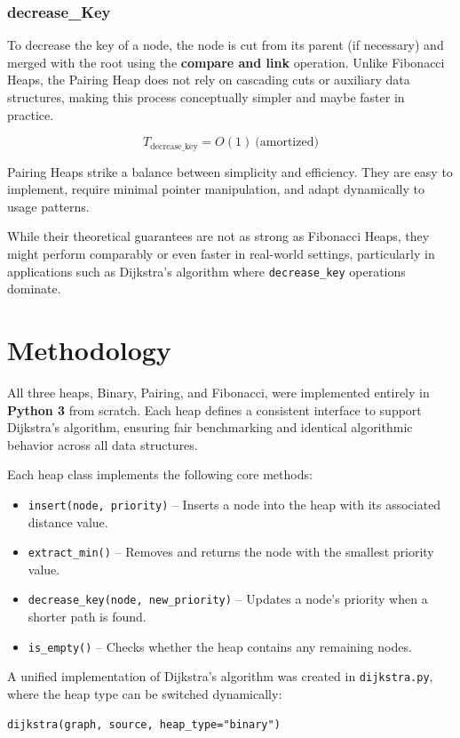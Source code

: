 \documentclass[acmsmall]{acmart}
\begin{document}
\subsubsection*{decrease\_Key}
To decrease the key of a node, the node is cut from its parent (if necessary) and merged with the root using the \textbf{compare and link} operation. Unlike Fibonacci Heaps, the Pairing Heap does not rely on cascading cuts or auxiliary data structures, making this process conceptually simpler and maybe faster in practice.

\[
T_{\text{decrease\_key}} = O(1)\ \text{(amortized)}
\]

Pairing Heaps strike a balance between simplicity and efficiency. They are easy to implement, require minimal pointer manipulation, and adapt dynamically to usage patterns.

\vspace{1em}
While their theoretical guarantees are not as strong as Fibonacci Heaps, they might perform comparably or even faster in real-world settings, particularly in applications such as Dijkstra’s algorithm where \texttt{decrease\_key} operations dominate.

\section{Methodology}
All three heaps, Binary, Pairing, and Fibonacci, were implemented entirely in \textbf{Python 3} from scratch.  
Each heap defines a consistent interface to support Dijkstra’s algorithm, ensuring fair benchmarking and identical algorithmic behavior across all data structures.

Each heap class implements the following core methods:
\begin{itemize}
  \item \texttt{insert(node, priority)} – Inserts a node into the heap with its associated distance value.
  \item \texttt{extract\_min()} – Removes and returns the node with the smallest priority value.
  \item \texttt{decrease\_key(node, new\_priority)} – Updates a node’s priority when a shorter path is found.
  \item \texttt{is\_empty()} – Checks whether the heap contains any remaining nodes.
\end{itemize}

A unified implementation of Dijkstra’s algorithm was created in \texttt{dijkstra.py}, where the heap type can be switched dynamically:
\begin{verbatim}
dijkstra(graph, source, heap_type="binary")
\end{verbatim}
\end{document}
